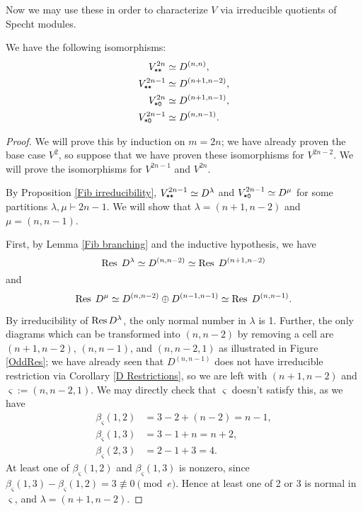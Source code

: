\documentclass{amsart}
\begin{document}
Now we may use these in order to characterize $V$ via irreducible quotients of Specht modules.
\begin{theorem}\label{Fibonacci Theorem}
  We have the following isomorphisms:
     \begin{align*}  
      V^{2n}_{\texttt{*}\texttt{*}} &\simeq D^{(n,n)},\\ 
      V^{2n-1}_{\texttt{*}\texttt{*}} &\simeq D^{(n+1,n-2)},\\
      V^{2n}_{\texttt{*}\texttt{0}} &\simeq D^{(n+1,n-1)},\\
      V^{2n-1}_{\texttt{*}\texttt{0}} &\simeq D^{(n,n-1)}.
     \end{align*}
\end{theorem}
\begin{proof}
  We will prove this by induction on $m = 2n$;
  we have already proven the base case $V^{2}$, so suppose that we have proven these isomorphisms for $V^{2n-2}$.
  We will prove the isomorphisms for $V^{2n-1}$ and $V^{2n}$.

  By Proposition \ref{Fib irreducibility}, $V^{2n-1}_{\texttt{*}\texttt{*}} \simeq D^{\lambda}$ and $V^{2n-1}_{\texttt{*}\texttt{0}} \simeq D^{\mu}$ for some partitions $\lambda,\mu \vdash 2n - 1$.
  We will show that $\lambda = (n+1,n-2)$ and $\mu = (n,n-1)$.
  
  First, by Lemma \ref{Fib branching} and the inductive hypothesis, we have \[\operatorname{Res} \; D^{\lambda} \simeq D^{(n,n-2)} \simeq \operatorname{Res} \; D^{(n+1,n-2)}\] and \[\operatorname{Res} \; D^{\mu} \simeq D^{(n,n-2)} \oplus D^{(n-1,n-1)} \simeq \operatorname{Res} \; D^{(n,n-1)}.\]
  
  By irreducibility of $\operatorname{Res} D^{\lambda}$, the only normal number in $\lambda$ is 1.\cite{Kleshchev,Brundan}
  Further, the only diagrams which can be transformed into $(n,n-2)$ by removing a cell are $(n+1,n-2)$, $(n,n-1)$, and $(n,n-2,1)$ as illustrated in Figure \ref{OddRes};
  we have already seen that $D^{(n,n-1)}$ does not have irreducible restriction via Corollary \ref{D Restrictions}, so we are left with $(n+1,n-2)$ and $\varsigma := (n,n-2,1)$.
  We may directly check that $\varsigma$ doesn't satisfy this, as we have
  \begin{align*} 
    \beta_\varsigma(1,2) &= 3 - 2 + (n-2) = n-1,\\
    \beta_\varsigma(1,3) &= 3 - 1 + n = n+2,\\
    \beta_\varsigma(2,3) &= 2 - 1 + 3 = 4.
   \end{align*} 
  At least one of $\beta_\varsigma(1,2)$ and $\beta_\varsigma(1,3)$ is nonzero, since $\beta_\varsigma(1,3) - \beta_\varsigma(1,2) = 3 \not\equiv 0 \pmod e$.
  Hence at least one of 2 or 3 is normal in $\varsigma$, and $\lambda = (n+1,n-2)$.


\end{proof}
\end{document}
